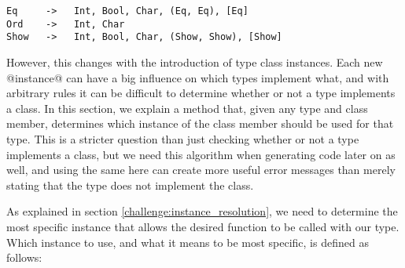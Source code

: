 \begin{lstlisting}[language=spl]
Eq     ->   Int, Bool, Char, (Eq, Eq), [Eq]
Ord    ->   Int, Char
Show   ->   Int, Bool, Char, (Show, Show), [Show]
\end{lstlisting}

However, this changes with the introduction of type class instances. Each new @instance@ can have a big influence on which types implement what, and with arbitrary rules it can be difficult to determine whether or not a type implements a class. In this section, we explain a method that, given any type and class member, determines which instance of the class member should be used for that type. This is a stricter question than just checking whether or not a type implements a class, but we need this algorithm when generating code later on as well, and using the same here can create more useful error messages than merely stating that the type does not implement the class.

As explained in section \ref{challenge:instance_resolution}, we need to determine the most specific instance that allows the desired function to be called with our type. Which instance to use, and what it means to be most specific, is defined as follows:


